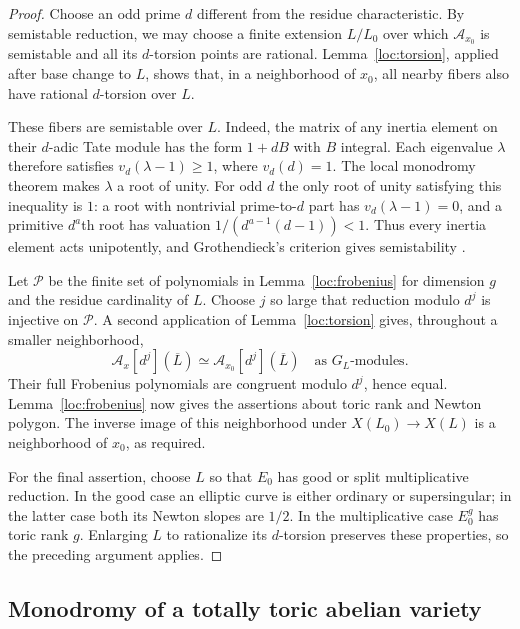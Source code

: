 \begin{proof}
Choose an odd prime $d$ different from the residue characteristic.
By semistable reduction, we may choose a finite extension $L/L_0$ over
which $\mathcal A_{x_0}$ is semistable and all its $d$-torsion points are
rational.  Lemma~\ref{loc:torsion}, applied after base change to $L$,
shows that, in a neighborhood of $x_0$, all nearby fibers also have
rational $d$-torsion over $L$.

These fibers are semistable over $L$.  Indeed, the matrix of any inertia
element on their $d$-adic Tate module has the form $1+dB$ with $B$
integral.  Each eigenvalue $\lambda$ therefore satisfies
$v_d(\lambda-1)\geq 1$, where $v_d(d)=1$.  The local monodromy theorem
makes $\lambda$ a root of unity.  For odd $d$ the only root of unity
satisfying this inequality is $1$: a root with nontrivial prime-to-$d$ part has
$v_d(\lambda-1)=0$, and a primitive $d^a$th root has valuation
$1/(d^{a-1}(d-1))<1$.  Thus every inertia element acts unipotently, and
Grothendieck's criterion gives semistability
\cite[Expos\'e IX]{SGA7I}.

Let $\mathcal P$ be the finite set of polynomials in
Lemma~\ref{loc:frobenius} for dimension $g$ and the residue cardinality
of $L$.  Choose $j$ so large that reduction modulo $d^j$ is injective on
$\mathcal P$.  A second application of Lemma~\ref{loc:torsion} gives,
throughout a smaller neighborhood,
\[
 \mathcal A_x[d^j](\overline L)\simeq
 \mathcal A_{x_0}[d^j](\overline L)
 \quad\text{as }G_L\text{-modules}.
\]
Their full Frobenius polynomials are congruent modulo $d^j$, hence equal.
Lemma~\ref{loc:frobenius} now gives the assertions about toric rank and
Newton polygon.  The inverse image of this neighborhood under
$X(L_0)\to X(L)$ is a neighborhood of $x_0$, as required.

For the final assertion, choose $L$ so that $E_0$ has good or split
multiplicative reduction.  In the good case an elliptic curve is either
ordinary or supersingular; in the latter case both its Newton slopes
are $1/2$.  In the multiplicative case $E_0^g$ has toric rank $g$.
Enlarging $L$ to rationalize its $d$-torsion preserves these properties,
so the preceding argument applies.
\end{proof}

\subsection{Monodromy of a totally toric abelian variety}

